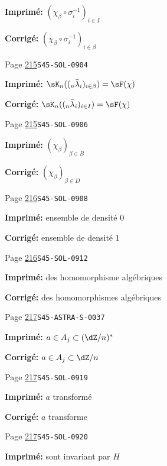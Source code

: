 \begin{description}
\par\noindent\textbf{Imprimé:} \((\chi_\beta\circ \sigma_i^{-1})_{i\in I}\)
\par\noindent\textbf{Corrigé:} \((\chi_\beta\circ \sigma_i^{-1})_{i\in\beta}\)
\smallskip
\item[\hypertarget{apparatus:FR-0225}{225}] Page \hyperlink{printpage:fr:215}{215}\quad\texttt{S45-SOL-0904}
\par\noindent\textbf{Imprimé:} \(\sK_n((_n\bar\lambda_i)_{i\in \beta}) = \sF(\chi)\)
\par\noindent\textbf{Corrigé:} \(\sK_n((_n\bar\lambda_i)_{i\in I}) = \sF(\chi)\)
\smallskip
\item[\hypertarget{apparatus:FR-0226}{226}] Page \hyperlink{printpage:fr:215}{215}\quad\texttt{S45-SOL-0906}
\par\noindent\textbf{Imprimé:} \((\chi_\beta)_{\beta\in B}\)
\par\noindent\textbf{Corrigé:} \((\chi_\beta)_{\beta\in D}\)
\smallskip
\item[\hypertarget{apparatus:FR-0227}{227}] Page \hyperlink{printpage:fr:216}{216}\quad\texttt{S45-SOL-0908}
\par\noindent\textbf{Imprimé:} ensemble de densité $0$
\par\noindent\textbf{Corrigé:} ensemble de densité $1$
\smallskip
\item[\hypertarget{apparatus:FR-0228}{228}] Page \hyperlink{printpage:fr:216}{216}\quad\texttt{S45-SOL-0912}
\par\noindent\textbf{Imprimé:} des homomorphisme algébriques
\par\noindent\textbf{Corrigé:} des homomorphismes algébriques
\smallskip
\item[\hypertarget{apparatus:FR-0229}{229}] Page \hyperlink{printpage:fr:217}{217}\quad\texttt{S45-ASTRA-S-0037}
\par\noindent\textbf{Imprimé:} $a\in A_j\subset (\dZ/n)^\ast$
\par\noindent\textbf{Corrigé:} $a\in A_j\subset\dZ/n$
\smallskip
\item[\hypertarget{apparatus:FR-0230}{230}] Page \hyperlink{printpage:fr:217}{217}\quad\texttt{S45-SOL-0919}
\par\noindent\textbf{Imprimé:} $a$ transformé
\par\noindent\textbf{Corrigé:} $a$ transforme
\smallskip
\item[\hypertarget{apparatus:FR-0231}{231}] Page \hyperlink{printpage:fr:217}{217}\quad\texttt{S45-SOL-0920}
\par\noindent\textbf{Imprimé:} sont invariant par $H$

\end{description}
